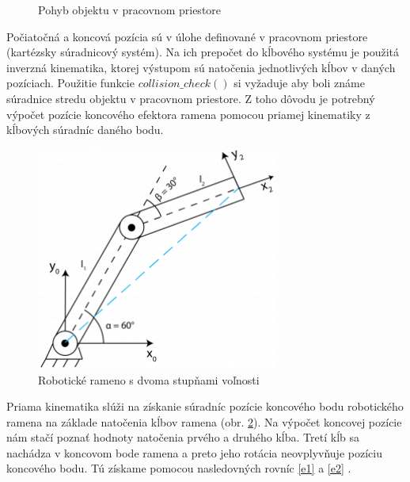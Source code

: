 \begin{figure}[h!]
 	\centering
 	\caption{Pohyb objektu v pracovnom priestore} \label{OBRAZOK 4.7} 
 \end{figure} 


Počiatočná a koncová pozícia sú v úlohe definované v pracovnom priestore (kartézsky súradnicový systém). Na ich prepočet do kĺbového systému je použitá inverzná kinematika, ktorej výstupom sú natočenia jednotlivých kĺbov v daných pozíciach. Použitie funkcie  $ collision\_check() $ si vyžaduje aby boli známe súradnice stredu objektu v pracovnom priestore. Z toho dôvodu je potrebný výpočet pozície koncového efektora ramena pomocou priamej kinematiky z kĺbových súradníc daného bodu.


 \begin{figure}[h]
	\centering
	\includegraphics[width=80mm]{img/FK1.png}
	\caption{Robotické rameno s dvoma stupňami voľnosti \cite{FK}} \label{OBRAZOK 4.8} 
\end{figure} 

Priama kinematika slúži na získanie súradníc pozície koncového bodu robotického ramena na základe natočenia kĺbov ramena (obr. \ref{OBRAZOK 4.8}). Na výpočet koncovej pozície nám stačí poznať hodnoty natočenia prvého a druhého kĺba. Tretí kĺb sa nachádza v koncovom bode ramena a preto jeho rotácia neovplyvňuje pozíciu koncového bodu.
Tú získame pomocou nasledovných rovníc  \ref{e1}  a  \ref{e2}  \cite{FK}.

